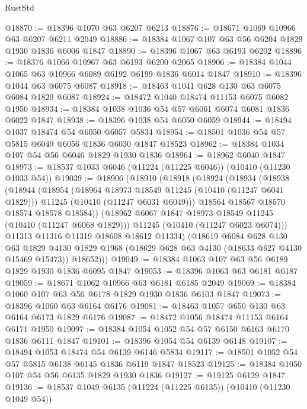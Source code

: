 \begin{lexlean}{RustStd}
\begin{coremodule}
@18870 := @18396 @1070 @63 @6207 @6213
@18876 := @18671 @1069 @10966 @63 @6207 @6211 @2049
@18886 := @18384 @1067 @107 @63 @56 @6204 @1829 @1930 @1836 @6006 @1847
@18890 := @18396 @1067 @63 @6193 @6202
@18896 := @18376 @1066 @10967 @63 @6193 @6200 @2065
@18906 := @18384 @1044 @1065 @63 @10966 @6089 @6192 @6199 @1836 @6014 @1847
@18910 := @18396 @1044 @63 @6075 @6087
@18918 := @18463 @1041 @628 @130 @63 @6075 @6084 @1829 @6087
@18924 := @18472 @1040 @18474 @11153 @6075 @6082 @1950
@18934 := @18384 @1038 @1036 @54 @57 @6061 @6074 @6081 @1836 @6022 @1847
@18938 := @18396 @1038 @54 @6050 @6059
@18944 := @18494 @1037 @18474 @54 @6050 @6057 @5834
@18954 := @18501 @1036 @54 @57 @5815 @6049 @6056 @1836 @6030 @1847 @18523
@18962 := @18384 @1034 @107 @54 @56 @6046 @1829 @1930 @1836
@18964 := @18962 @6040 @1847
@18973 := @18537 @1033 @6046 (@11224 (@11225 @6046)) (@10410 (@11230 @1033 @54))
@19039 := @18906
    (@18910
      (@18918
        (@18924
          (@18934
            (@18938
              (@18944
                (@18954
                  (@18964 @18973 @18549 @11245 (@10410 (@11247 @6041 @1829)))
                  @11245
                  (@10410 (@11247 @6031 @6049)))
                @18564
                @18567
                @18570
                @18574
                @18578
                @18584))
            (@18962 @6067 @1847 @18973 @18549 @11245 (@10410 (@11247 @6068 @1829)))
            @11245
            (@10410 (@11247 @6023 @6074)))
          @11313
          @11316
          @11319
          @18608
          @18612
          @11334)
        (@18619
          @6084
          @628
          @130
          @63
          @1829
          @4130
          @1829
          @1968
          (@18629 @628 @63 @4130 (@18633 @627 @4130 @15469 @15473))
          @18652)))
@19049 := @18384 @1063 @107 @63 @56 @6189 @1829 @1930 @1836 @6095 @1847
@19053 := @18396 @1063 @63 @6181 @6187
@19059 := @18671 @1062 @10966 @63 @6181 @6185 @2049
@19069 := @18384 @1060 @107 @63 @56 @6178 @1829 @1930 @1836 @6103 @1847
@19073 := @18396 @1060 @63 @6164 @6176
@19081 := @18463 @1057 @650 @130 @63 @6164 @6173 @1829 @6176
@19087 := @18472 @1056 @18474 @11153 @6164 @6171 @1950
@19097 := @18384 @1054 @1052 @54 @57 @6150 @6163 @6170 @1836 @6111 @1847
@19101 := @18396 @1054 @54 @6139 @6148
@19107 := @18494 @1053 @18474 @54 @6139 @6146 @5834
@19117 := @18501 @1052 @54 @57 @5815 @6138 @6145 @1836 @6119 @1847 @18523
@19125 := @18384 @1050 @107 @54 @56 @6135 @1829 @1930 @1836
@19127 := @19125 @6129 @1847
@19136 := @18537 @1049 @6135 (@11224 (@11225 @6135)) (@10410 (@11230 @1049 @54))

\end{coremodule}
\end{lexlean}
